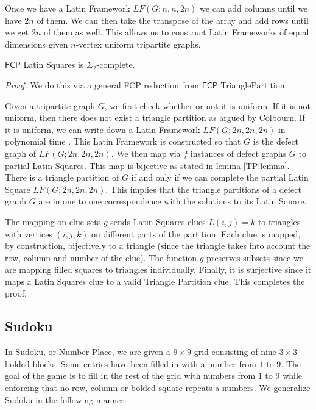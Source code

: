 \documentclass[runningheads,a4paper]{llncs}
\begin{document}
Once we have a Latin Framework $LF(G;n, n, 2n)$ we can add columns until we have $2n$ of them. We can then take the transpose of the array and add rows until we get $2n$ of them as well. This allows us to construct Latin Frameworks of equal dimensions given $n$-vertex uniform tripartite graphs. 

\begin{theorem}
$\mathsf{FCP}$ Latin Squares is $\Sigma_2$-complete.
\end{theorem}

\begin{proof}
We do this via a general FCP reduction from $\mathsf{FCP}$ TrianglePartition.

Given a tripartite graph $G$, we first check whether or not it is uniform. If it is not uniform, then there does not exist a triangle partition as argued by Colbourn. If it is uniform, we can write down a Latin Framework $LF(G;2n,2n,2n)$ in polynomial time \cite{colbourn1984complexity}. This Latin Framework is constructed so that $G$ is the defect graph of $LF(G;2n,2n,2n)$. We then map via $f$ instances of defect graphs $G$ to partial Latin Squares. This map is bijective as stated in lemma \ref{TP:lemma}. There is a triangle partition of $G$ if and only if we can complete the partial Latin Square $LF(G;2n,2n,2n)$. This implies that the triangle partitions of a defect graph $G$ are in one to one correspondence with the solutions to its Latin Square. 

The mapping on clue sets $g$ sends Latin Squares clues $L(i,j) = k$ to triangles with vertices $(i,j,k)$ on different parts of the partition. Each clue is mapped, by construction, bijectively to a triangle (since the triangle takes into account the row, column and number of the clue). The function $g$ preserves subsets since we are mapping filled squares to triangles individually. Finally, it is surjective since it maps a Latin Squares clue to a valid Triangle Partition clue. This completes the proof.

\end{proof}

\subsection{Sudoku}

In Sudoku, or Number Place, we are given a $9 \times 9$ grid consisting of nine $3 \times 3$ bolded blocks. Some entries have been filled in with a number from $1$ to $9$. The goal of the game is to fill in the rest of the grid with numbers from $1$ to $9$ while enforcing that no row, column or bolded square repeats a numbers. We generalize Sudoku in the following manner:
\end{document}
